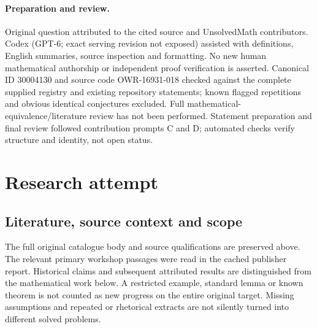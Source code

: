 \documentclass[11pt]{article}
\begin{document}
\paragraph{Preparation and review.}
Original question attributed to the cited source and UnsolvedMath contributors. Codex (GPT-6; exact serving revision not exposed) assisted with definitions, English summaries, source inspection and formatting. No new human mathematical authorship or independent proof verification is asserted. Canonical ID 30004130 and source code OWR-16931-018 checked against the complete supplied registry and existing repository statements; known flagged repetitions and obvious identical conjectures excluded. Full mathematical-equivalence/literature review has not been performed. Statement preparation and final review followed contribution prompts C and D; automated checks verify structure and identity, not open status.
\label{end:30004130}

\section{Research attempt}
\subsection{Literature, source context and scope}
The full original catalogue body and source qualifications are preserved above. The relevant primary workshop passages were read in the cached publisher report. Historical claims and subsequent attributed results are distinguished from the mathematical work below. A restricted example, standard lemma or known theorem is not counted as new progress on the entire original target. Missing assumptions and repeated or rhetorical extracts are not silently turned into different solved problems.
\end{document}
